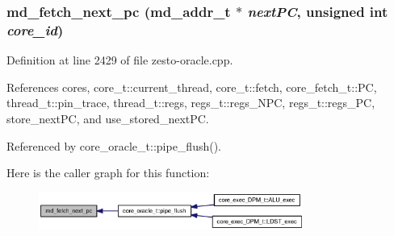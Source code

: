 \subsubsection[{md\_\-fetch\_\-next\_\-pc}]{ md\_\-fetch\_\-next\_\-pc ({\bf md\_\-addr\_\-t} $\ast$ {\em nextPC}, \/  unsigned int {\em core\_\-id})}\label{zesto-oracle_8h_4603dc5f3e60fbfcd30343123777d18c}




Definition at line 2429 of file zesto-oracle.cpp.

References cores, core\_\-t::current\_\-thread, core\_\-t::fetch, core\_\-fetch\_\-t::PC, thread\_\-t::pin\_\-trace, thread\_\-t::regs, regs\_\-t::regs\_\-NPC, regs\_\-t::regs\_\-PC, store\_\-nextPC, and use\_\-stored\_\-nextPC.

Referenced by core\_\-oracle\_\-t::pipe\_\-flush().

Here is the caller graph for this function:\nopagebreak
\begin{figure}[H]
\begin{center}
\leavevmode
\includegraphics[width=246pt]{zesto-oracle_8h_4603dc5f3e60fbfcd30343123777d18c_icgraph}
\end{center}
\end{figure}
